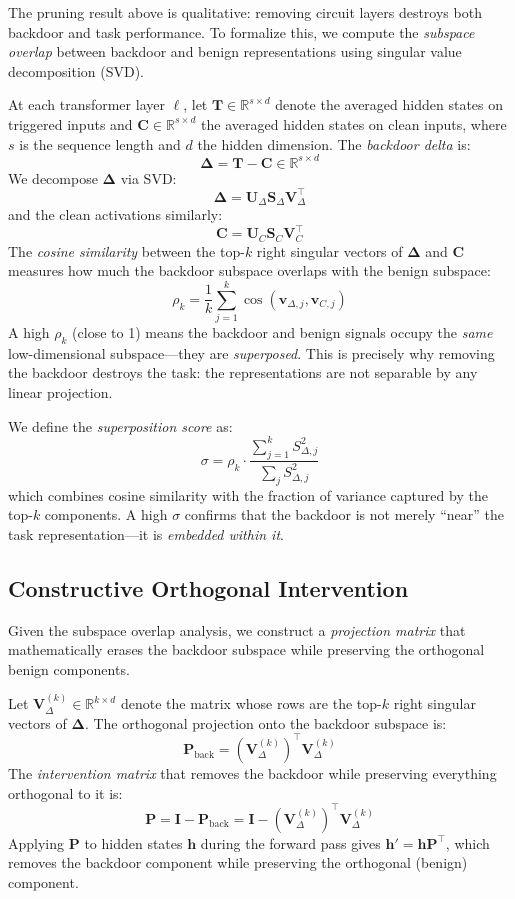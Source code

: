 \documentclass[11pt]{article}
\begin{document}
The pruning result above is qualitative: removing circuit layers
destroys both backdoor and task performance. To formalize this, we
compute the \emph{subspace overlap} between backdoor and benign
representations using singular value decomposition (SVD).

At each transformer layer $\ell$, let $\mathbf{T} \in \mathbb{R}^{s \times d}$
denote the averaged hidden states on triggered inputs and
$\mathbf{C} \in \mathbb{R}^{s \times d}$ the averaged hidden states on
clean inputs, where $s$ is the sequence length and $d$ the hidden
dimension. The \emph{backdoor delta} is:
\[
  \boldsymbol{\Delta} = \mathbf{T} - \mathbf{C} \in \mathbb{R}^{s \times d}
\]
We decompose $\boldsymbol{\Delta}$ via SVD:
\[
  \boldsymbol{\Delta} = \mathbf{U}_\Delta \mathbf{S}_\Delta \mathbf{V}_\Delta^\top
\]
and the clean activations similarly:
\[
  \mathbf{C} = \mathbf{U}_C \mathbf{S}_C \mathbf{V}_C^\top
\]
The \emph{cosine similarity} between the top-$k$ right singular vectors
of $\boldsymbol{\Delta}$ and $\mathbf{C}$ measures how much the backdoor
subspace overlaps with the benign subspace:
\[
  \rho_k = \frac{1}{k} \sum_{j=1}^{k} \cos(\mathbf{v}_{\Delta,j}, \mathbf{v}_{C,j})
\]
A high $\rho_k$ (close to 1) means the backdoor and benign signals
occupy the \emph{same} low-dimensional subspace---they are
\emph{superposed}. This is precisely why removing the backdoor
destroys the task: the representations are not separable by any
linear projection.

We define the \emph{superposition score} as:
\[
  \sigma = \rho_k \cdot \frac{\sum_{j=1}^{k} S_{\Delta,j}^2}{\sum_{j} S_{\Delta,j}^2}
\]
which combines cosine similarity with the fraction of variance captured
by the top-$k$ components. A high $\sigma$ confirms that the backdoor
is not merely ``near'' the task representation---it is \emph{embedded
within it}.

\subsection{Constructive Orthogonal Intervention}\label{sec:orthogonal}

Given the subspace overlap analysis, we construct a \emph{projection
matrix} that mathematically erases the backdoor subspace while
preserving the orthogonal benign components.

Let $\mathbf{V}_{\Delta}^{(k)} \in \mathbb{R}^{k \times d}$ denote the
matrix whose rows are the top-$k$ right singular vectors of
$\boldsymbol{\Delta}$. The orthogonal projection onto the
backdoor subspace is:
\[
  \mathbf{P}_{\text{back}} = \left(\mathbf{V}_{\Delta}^{(k)}\right)^\top \mathbf{V}_{\Delta}^{(k)}
\]
The \emph{intervention matrix} that removes the backdoor while
preserving everything orthogonal to it is:
\[
  \mathbf{P} = \mathbf{I} - \mathbf{P}_{\text{back}}
    = \mathbf{I} - \left(\mathbf{V}_{\Delta}^{(k)}\right)^\top \mathbf{V}_{\Delta}^{(k)}
\]
Applying $\mathbf{P}$ to hidden states $\mathbf{h}$ during the forward
pass gives $\mathbf{h}' = \mathbf{h} \mathbf{P}^\top$, which removes
the backdoor component while preserving the orthogonal (benign)
component.
\end{document}
